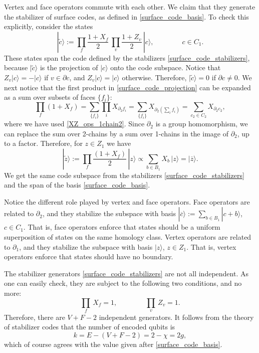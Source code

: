 \documentclass{article}
\newcommand{\sset}[1]{ \{#1\} }
\newcommand{\ket}[1]{|#1\rangle}
\begin{document}
Vertex and face operators commute with each other. We claim that they generate the stabilizer of surface codes, as defined in \eqref{surface_code_basis}. To check this explicitly,  consider the states
\begin{equation}\label{surface_code_projection}
\ket {\tilde c}:=  \prod_{f}\frac {1+X_f}2 \,\prod_{v}\frac {1+Z_v}2\,\ket c,\qquad\qquad c\in C_1.
\end{equation}
These states span the code defined by the stabilizers \eqref{surface_code_stabilizers}, because $\ket {\tilde c}$ is the projection of $\ket c$ onto the code subspace. Notice that $Z_v\ket c=-\ket c$ if $v\in \partial c$, and $Z_v\ket c= \ket c$ otherwise. Therefore, $\ket {\tilde c}=0$ if $\partial c\neq 0$. We next notice that the first product in \eqref{surface_code_projection} can be expanded as a sum over subsets of faces $\sset{f_i}$:
\begin{equation}\label{surface_code_projection2}
\prod_{f} (1+X_f) =  \sum_{\sset{f_i}} \prod_i X_{\partial_2 f_i} =   \sum_{\sset{f_i}} X_{\partial_2 (\sum_i f_i)} = \sum_{c_2 \in C_2} X_{\partial_2 c_2},
\end{equation}
where we have used \eqref{XZ_ops_1chain2}. Since $\partial_2$ is a group homomorphism, we can replace the sum over 2-chains by a sum over 1-chains in the image of $\partial_2$, up to a factor. Therefore, for $z\in Z_1$ we have
\begin{equation}\label{surface_code_projection3}
\ket {\tilde z}:=  \prod_{f}\frac {(1+X_f)}2 \,\ket z\propto\sum_{b\in B_1} X_b \,\ket z=\ket {\overline z}.
\end{equation}
We get the same code subspace from the stabilizers \eqref{surface_code_stabilizers} and the span of the basis \eqref{surface_code_basis}.

Notice the different role played by vertex and face operators. Face operators are related to $\partial_2$, and they stabilize the subspace with basis $\ket {\overline c}:=\sum_{b\in B_1} \ket {c+b}$, $c\in C_1$. That is, face operators enforce that states should be a uniform superposition of states on the same homology class. Vertex operators are related to $\partial_1$, and they stabilize the subspace with basis $\ket z$, $z\in Z_1$. That is, vertex operators enforce that states should have no boundary.

The stabilizer generators \eqref{surface_code_stabilizers} are not all independent. As one can easily check, they are subject to the following two conditions, and no more:
\begin{equation}\label{surface_code_stabilizers_constraint}
 \prod_f \, X_f=1,\qquad\qquad \prod_v\,Z_v=1.
\end{equation}
Therefore, there are $V+F-2$ independent generators. It follows from the theory of stabilizer codes that the number of encoded qubits is
\begin{equation}
k=E-(V+F-2)=2-\chi = 2g,
\end{equation}
which of course agrees with the value given after \eqref{surface_code_basis}.
\end{document}
